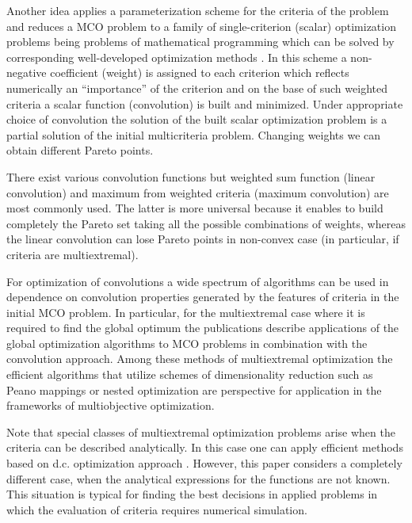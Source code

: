 \documentclass[runningheads]{llncs}
\begin{document}
Another idea applies a parameterization scheme for the criteria of the problem and reduces a MCO problem to a family of single-criterion (scalar) optimization problems being problems of mathematical programming which can be solved by corresponding well-developed optimization methods \cite{Collette2004,Ehrgott2005}. In this scheme a non-negative coefficient (weight) is assigned to each criterion which reflects numerically an ``importance'' of the criterion and on the base of such weighted criteria a scalar function (convolution) is built and minimized. Under appropriate choice of convolution the solution of the built scalar optimization problem is a partial solution of the initial multicriteria problem. Changing weights we can obtain different Pareto points. 

There exist various convolution functions but weighted sum function (linear convolution) and maximum from weighted criteria (maximum convolution) are most commonly used. The latter is more universal because it enables to build completely the Pareto set taking all the possible combinations of weights, whereas the linear convolution can lose Pareto points in non-convex case (in particular, if criteria are multiextremal).

For optimization of convolutions a wide spectrum of algorithms can be used in dependence on convolution properties generated by the features of criteria in the initial MCO problem. In particular, for the multiextremal case where it is required to find the global optimum the publications \cite{Evtushenko2014,Zilinskas2015,GERGEL2017_1,Gergel2019_2,Barkalov2021} describe applications of the global optimization algorithms to MCO problems in combination with the convolution approach. Among these methods of multiextremal optimization the efficient algorithms that utilize  schemes of dimensionality reduction such as Peano mappings \cite{Strongin2000,Sergeyev2013} or nested optimization \cite{Strongin2000,Grishagin2015_2,Grishagin2018} are perspective for application in the  frameworks of multiobjective optimization.

Note that special classes of multiextremal optimization problems arise when the criteria can be described analytically. In this case one can apply efficient methods based on d.c. optimization approach \cite{Strekalovsky2001,Strekalovsky2003,Strekalovsky2020}. However, this paper considers a completely different case, when the analytical expressions for the functions are not known. This situation is typical for finding the best decisions in applied problems in which the evaluation of criteria requires numerical simulation.
\end{document}
